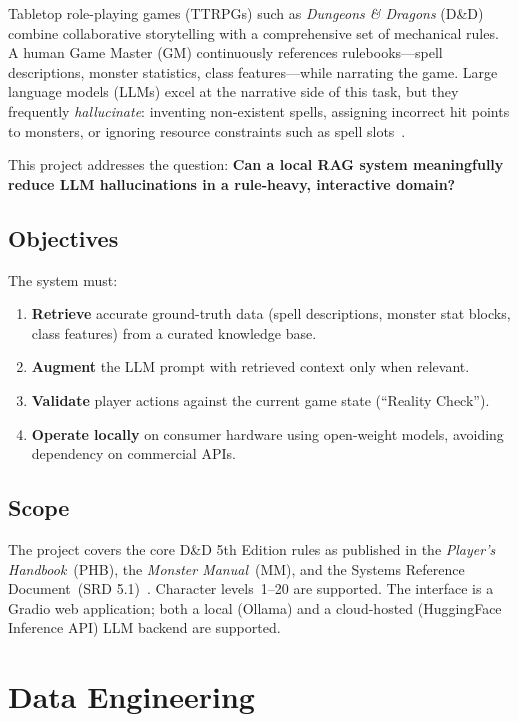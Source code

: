 \documentclass[12pt,a4paper]{article}
\begin{document}
Tabletop role-playing games (TTRPGs) such as \emph{Dungeons \& Dragons} (D\&D)
combine collaborative storytelling with a comprehensive set of mechanical
rules. A human Game Master (GM) continuously references
rulebooks---spell descriptions, monster statistics, class features---while
narrating the game. Large language models (LLMs) excel at the narrative side
of this task, but they frequently \emph{hallucinate}: inventing non-existent
spells, assigning incorrect hit points to monsters, or ignoring resource
constraints such as spell slots~\cite{lewis2020rag}.

This project addresses the question: \textbf{Can a local RAG system
meaningfully reduce LLM hallucinations in a rule-heavy, interactive domain?}

\subsection{Objectives}

The system must:
\begin{enumerate}[noitemsep]
    \item \textbf{Retrieve} accurate ground-truth data (spell descriptions,
          monster stat blocks, class features) from a curated knowledge base.
    \item \textbf{Augment} the LLM prompt with retrieved context only when
          relevant.
    \item \textbf{Validate} player actions against the current game state
          (``Reality Check'').
    \item \textbf{Operate locally} on consumer hardware using open-weight
          models, avoiding dependency on commercial APIs.
\end{enumerate}

\subsection{Scope}

The project covers the core D\&D 5th Edition rules as published in the
\emph{Player's Handbook}~(PHB), the \emph{Monster Manual}~(MM), and the
Systems Reference Document~(SRD 5.1)~\cite{wotc_srd}. Character levels~1--20
are supported. The interface is a Gradio web application; both a local
(Ollama) and a cloud-hosted (HuggingFace Inference API) LLM backend are
supported.

\section{Data Engineering}
\label{sec:data}
\end{document}

